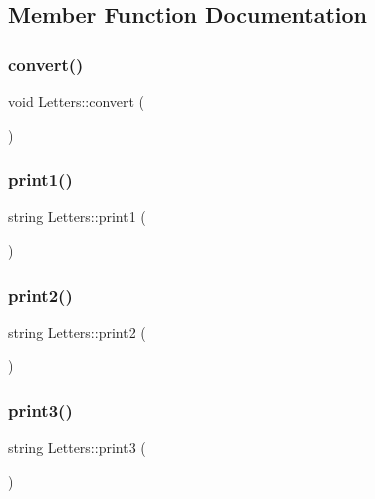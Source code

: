 \subsection{Member Function Documentation}
\mbox{\label{class_letters_a8c85042e9cd2761a376e5db239e3d44b}} 
\subsubsection{convert()}
{\footnotesize\ttfamily void Letters\+::convert (\begin{DoxyParamCaption}{ }\end{DoxyParamCaption})\hspace{0.3cm}{\ttfamily [inline]}}

\mbox{\label{class_letters_a785399ef97ab14f99a073b43f898877f}} 
\subsubsection{print1()}
{\footnotesize\ttfamily string Letters\+::print1 (\begin{DoxyParamCaption}{ }\end{DoxyParamCaption})\hspace{0.3cm}{\ttfamily [inline]}}

\mbox{\label{class_letters_ac05e0918761da5bd3e0def664666ab6e}} 
\subsubsection{print2()}
{\footnotesize\ttfamily string Letters\+::print2 (\begin{DoxyParamCaption}{ }\end{DoxyParamCaption})\hspace{0.3cm}{\ttfamily [inline]}}

\mbox{\label{class_letters_accac944f5910c09e5beca67be0d2c215}} 
\subsubsection{print3()}
{\footnotesize\ttfamily string Letters\+::print3 (\begin{DoxyParamCaption}{ }\end{DoxyParamCaption})\hspace{0.3cm}{\ttfamily [inline]}}

